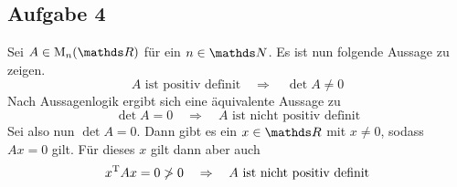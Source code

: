 

		\subsection*{Aufgabe 4} %
		\label{sub:aufgabe_4}
		
			Sei $A\in\m{M}_n(\SR)$ für ein $n\in\SN$. Es ist nun folgende Aussage zu zeigen.
			\[ A \text{ ist positiv definit} \quad \Rightarrow \quad \det A \neq 0 \]
			Nach Aussagenlogik ergibt sich eine äquivalente Aussage zu
			\[ \det A = 0 \quad \Rightarrow \quad A \text{ ist nicht positiv definit} \]
			Sei also nun $\det A = 0$.
			Dann gibt es ein $x\in\SR$ mit $x\neq 0$, sodass $Ax = 0$ gilt.
			Für dieses $x$ gilt dann aber auch
			\[ x^{\mathrm{T}}Ax = 0 \not>0 \quad \Rightarrow \quad A \text{ ist nicht positiv definit} \]
			\qedbox

	

